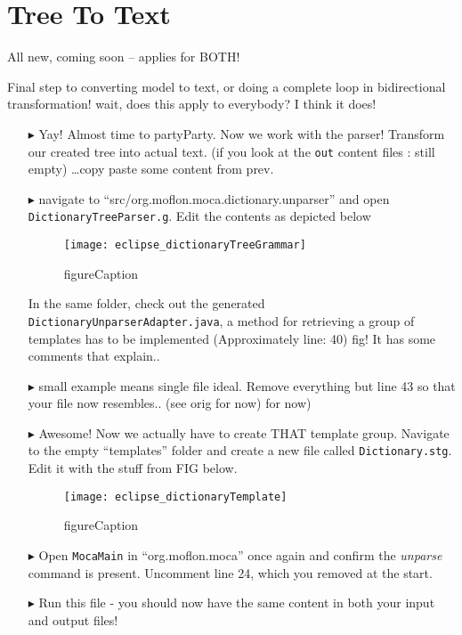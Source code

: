 \newpage
\hypertarget{}{}
\section{Tree To Text}
\genHeader

All new, coming soon -- applies for BOTH!

Final step to converting model to text, or doing a complete loop in bidirectional transformation! wait, does this apply to everybody? I think it does!

\begin{itemize}

\item[$\blacktriangleright$] Yay! Almost time to partyParty. Now we work with the parser! Transform our created tree into actual text. (if you look at the
\texttt{out} content files : still empty) \ldots copy paste some content from prev.

\item[$\blacktriangleright$] navigate to ``src/org.moflon.moca.dictionary.unparser'' and open \texttt{DictionaryTreeParser.g}. Edit the contents as
depicted below

\begin{figure}[htp]
\begin{center}
  \texttt{[image: eclipse\_dictionaryTreeGrammar]}
  \caption{figureCaption}
  \label{eclipse:treeGrammar}
\end{center}
\end{figure}

In the same folder, check out the generated \texttt{DictionaryUnparserAdapter.java}, a method for retrieving a group of templates
has to be implemented (Approximately line: 40) fig! It has some comments that explain..

\item[$\blacktriangleright$] small example means single file ideal. Remove everything but line 43 so that your file now resembles.. (see orig for now)
for now)

\item[$\blacktriangleright$] Awesome! Now we actually have to create THAT template group. Navigate to the empty ``templates'' folder and create a new file
called \texttt{Dictionary.stg}. Edit it with the stuff from FIG below.


\begin{figure}[htp]
\begin{center}
  \texttt{[image: eclipse\_dictionaryTemplate]}
  \caption{figureCaption}
  \label{eclipse:dictionaryTemplate}
\end{center}
\end{figure}

\item[$\blacktriangleright$] Open \texttt{MocaMain} in ``org.moflon.moca'' once again and confirm the \emph{unparse} command is present. Uncomment line 24,
which you removed at the start.

\item[$\blacktriangleright$] Run this file - you should now have the same content in both your input and output files!

\end{itemize}